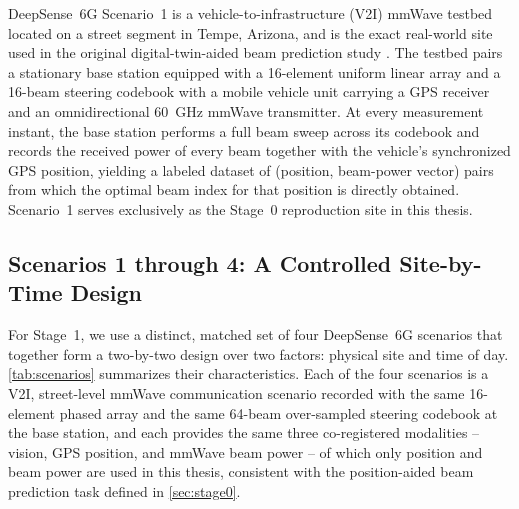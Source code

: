 \documentclass{iutbscthesis}
\begin{document}
DeepSense~6G Scenario~1 is a vehicle-to-infrastructure (V2I) mmWave testbed located on a street segment in Tempe, Arizona, and is the exact real-world site used in the original digital-twin-aided beam prediction study \cite{jiang2023digitaltwinbeam}. The testbed pairs a stationary base station equipped with a 16-element uniform linear array and a 16-beam steering codebook with a mobile vehicle unit carrying a GPS receiver and an omnidirectional 60~GHz mmWave transmitter. At every measurement instant, the base station performs a full beam sweep across its codebook and records the received power of every beam together with the vehicle's synchronized GPS position, yielding a labeled dataset of (position, beam-power vector) pairs from which the optimal beam index for that position is directly obtained. Scenario~1 serves exclusively as the Stage~0 reproduction site in this thesis.

\subsection{Scenarios 1 through 4: A Controlled Site-by-Time Design}

For Stage~1, we use a distinct, matched set of four DeepSense~6G scenarios that together form a two-by-two design over two factors: physical site and time of day. \autoref{tab:scenarios} summarizes their characteristics. Each of the four scenarios is a V2I, street-level mmWave communication scenario recorded with the same 16-element phased array and the same 64-beam over-sampled steering codebook at the base station, and each provides the same three co-registered modalities -- vision, GPS position, and mmWave beam power -- of which only position and beam power are used in this thesis, consistent with the position-aided beam prediction task defined in \autoref{sec:stage0}.
\end{document}
